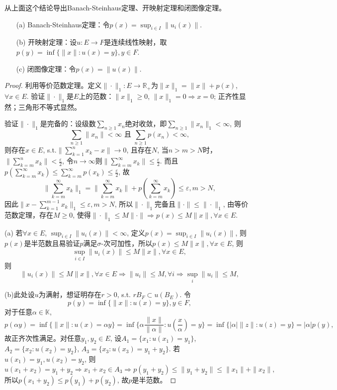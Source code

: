 \documentclass[a4paper,8pt]{ctexart}\textwidth 140mm \textheight 216mm
\newcommand{\e}{\varepsilon}
\newcommand{\8}{\infty}
\begin{document}
从上面这个结论导出Banach-Steinhaus定理、开映射定理和闭图像定理。
\begin{itemize}
	\item[(a)] Banach-Steinhaus定理：令$p(x)=\sup_{i\in I}\|u_i(x)\|$.
	\item[(b)] 开映射定理：设$u:E\to F$是连续线性映射，取$p(y)=\inf\{\|x\|:u(x)=y\},y\in F$.
	\item[(c)] 闭图像定理：令$p(x)=\|u(x)\|$.
\end{itemize}
\begin{proof}
	利用等价范数定理。定义$\|\cdot\|_1:E\to\mathbb{R}_+$为$\|x\|_1=\|x\|+p(x)$, $\forall x\in E$. 验证$\|\cdot\|_1$是$E$上的范数：$\|x\|_1\geq 0$, $\|x\|_1=0\Rightarrow x=0$; 正齐性显然；三角形不等式显然。
	
	验证$\|\cdot\|_1$是完备的：设级数$\sum_{n\geq 1}x_n$绝对收敛，即$\sum_{n\geq 1}\|x_n\|_1<\infty$, 则
	$$\sum_{n\geq 1}\|x_n\|<\infty\mbox{ 且 }\sum_{n\geq 1}p(x_n)<\infty,$$
	则存在$x\in E$, s.t.$\|\sum_{k=1}^n x_k-x\|\to 0$, 且存在$N$, 当$n>m>N$时，$\|\sum_{k=m}^n x_k\|<\frac{\e}{2}$, 令$n\to\infty$则$\|\sum_{k=m}^\infty x_k\|\leq\frac{\e}{2}$. 而且$p(\sum_{k=m}^\infty x_k)\leq\sum_{k=m}^\infty p(x_k)\leq \frac{\e}{2}$, 故
	\begin{equation*}
	\|\sum_{k=m}^\infty x_k\|_1=\|\sum_{k=m}^\infty x_k\|+p(\sum_{k=m}^\infty x_k)\leq \e, m>N,
	\end{equation*}
	因此$\|x-\sum_{k=1}^{m-1}x_k\|_1\leq \e,m>N$, 所以$\|\cdot\|_1$完备且$\|\cdot\|\leq\|\cdot\|_1$, 由等价范数定理，存在$M\geq 0$, 使得$\|\cdot\|_1\leq M\|\cdot\|\Rightarrow p(x)\leq M\|x\|,\forall x\in E$.
	
	(a) 若$\forall x\in E$, $\sup_{i\in I}\|u_i(x)\|<\infty$, 定义$p(x)=\sup_{i\in I}\|u_i(x)\|$, 则$p(x)$是半范数且易验证$p$满足$\sigma$-次可加性，所以$p(x)\leq M\|x\|,\forall x\in E$, 则
	$$\sup_{i\in I}\|u_i(x)\|\leq M\|x\|, \forall x\in E,$$
	则
	$$\|u_i(x)\|\leq M\|x\|,\forall x\in　E\Rightarrow \|u_i\|\leq M, \forall i\Rightarrow \sup_{i}\|u_i\|\leq M,$$
	
	(b)此处设$u$为满射，想证明存在$r>0$, s.t. $rB_F\subset u(B_E)$. 令
	$$p(y)=\inf\{\|x\|:u(x)=y\},y\in F,$$
	对于任意$\alpha\in\mathbb{K}$, 
	$$p(\alpha y)=\inf \{\|x\|:u(x)=\alpha y\}=\inf\{\alpha\frac{\|x\|}{\|\alpha\|}:u(\frac{x}{\alpha})=y\}=\inf\{|\alpha|\|z\|:u(z)=y\}=|\alpha|p(y),$$
	故正齐次性满足。对任意$y_1,y_2\in E$, 设$A_1=\{x_1:u(x_1)=y_1\}$, $A_2=\{x_2:u(x_2)=y_2\}$, $A_3=\{x_3:u(x_3)=y_1+y_2\}$. 若$u(x_1)=y_1,u(x_2)=y_2$, 则
	$$u(x_1+x_2)=y_1+y_2\Rightarrow x_1+x_2\in A_3\Rightarrow p(y_1+y_2)\leq \|y_1+y_2\|\leq \|x_1\|+\|x_2\|,$$
	所以$p(x_1+y_2)\leq p(y_1)+p(y_2)$, 故$p$是半范数。
	

\end{proof}
\end{document}
